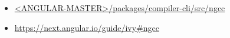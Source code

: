 








\begin{itemize}
  \item \href{https://github.com/angular/angular/tree/master/packages/compiler-cli/src/ngcc}
        {<ANGULAR-MASTER>/packages/compiler-cli/src/ngcc}
\end{itemize}




\begin{itemize}
  \item \url{https://next.angular.io/guide/ivy#ngcc}
\end{itemize}

